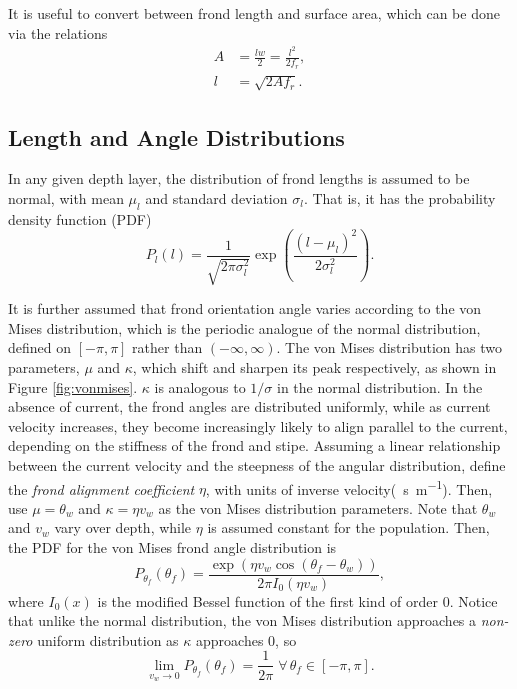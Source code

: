 It is useful to convert between frond length and surface area, which can be done via the relations
\begin{align}
  A &= \frac{lw}{2} = \frac{l^2}{2f_r}, \\
  l &= \sqrt{2Af_r}.
  \label{eqn:length-from-area}
\end{align}

\subsection{Length and Angle Distributions}
\label{sec:dist}
In any given depth layer, the distribution of frond lengths is assumed to be normal, with mean $\mu_l$ and standard deviation $\sigma_l$.
That is, it has the probability density function (PDF)
\begin{equation*}
  P_l(l) = \frac{1}{\sqrt{2\pi\sigma_l^2}}\exp\left(\frac{(l-\mu_l)^2}{2\sigma_l^2}\right).
\end{equation*}

It is further assumed that frond orientation angle varies according to the von Mises distribution, which is the periodic analogue of the normal distribution, defined on $[-\pi,\pi]$ rather than $(-\infty,\infty)$.
The von Mises distribution has two parameters, $\mu$ and $\kappa$, which shift and sharpen its peak respectively, as shown in Figure \ref{fig:vonmises}.
$\kappa$ is analogous to $1/\sigma$ in the normal distribution.
In the absence of current, the frond angles are distributed uniformly, while as current velocity increases, they become increasingly likely to align parallel to the current, depending on the stiffness of the frond and stipe.
Assuming a linear relationship between the current velocity and the steepness of the angular distribution, define the \textit{frond alignment coefficient} $\eta$, with units of inverse velocity(\SI{}{\s\per\m}).
Then, use $\mu = \theta_w$ and $\kappa = \eta v_w$ as the von Mises distribution parameters.
Note that $\theta_w$ and $v_w$ vary over depth, while $\eta$ is assumed constant for the population.
Then, the PDF for the von Mises frond angle distribution is
\begin{equation*}
	P_{\theta_f}(\theta_f) = \frac{\exp\left(\eta v_w\cos(\theta_f-\theta_w)\right)}{2\pi I_0(\eta v_w)},
\end{equation*}
where $I_0(x)$ is the modified Bessel function of the first kind of order 0.
Notice that unlike the normal distribution, the von Mises distribution approaches a \textit{non-zero} uniform distribution as $\kappa$ approaches 0, so
\begin{equation*}
	\displaystyle \lim_{v_w \to 0}P_{\theta_f}(\theta_f) = \frac{1}{2\pi} \;\forall\, \theta_f \in [-\pi,\pi].
\end{equation*}

